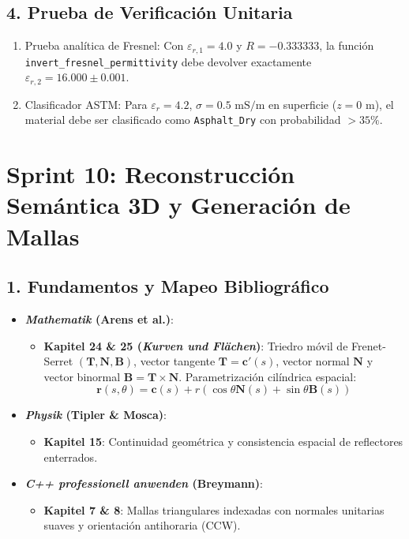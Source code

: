 \documentclass[11pt,a4paper]{article}
\begin{document}
\subsection{4. Prueba de Verificación Unitaria}
\begin{enumerate}
    \item Prueba analítica de Fresnel: Con $\varepsilon_{r,1} = 4.0$ y $R = -0.333333$, la función \texttt{invert\_fresnel\_permittivity} debe devolver exactamente $\varepsilon_{r,2} = 16.000 \pm 0.001$.
    \item Clasificador ASTM: Para $\varepsilon_r = 4.2$, $\sigma = 0.5\text{ mS/m}$ en superficie ($z=0\text{ m}$), el material debe ser clasificado como \texttt{Asphalt\_Dry} con probabilidad $> 35\%$.
\end{enumerate}

\section{Sprint 10: Reconstrucción Semántica 3D y Generación de Mallas}

\subsection{1. Fundamentos y Mapeo Bibliográfico}
\begin{itemize}
    \item \textbf{\textit{Mathematik} (Arens et al.)}:
    \begin{itemize}
        \item \textbf{Kapitel 24 \& 25 (\textit{Kurven und Flächen})}: Triedro móvil de Frenet-Serret $(\mathbf{T}, \mathbf{N}, \mathbf{B})$, vector tangente $\mathbf{T} = \mathbf{c}'(s)$, vector normal $\mathbf{N}$ y vector binormal $\mathbf{B} = \mathbf{T} \times \mathbf{N}$.
        Parametrización cilíndrica espacial:
        \begin{equation}
            \mathbf{r}(s, \theta) = \mathbf{c}(s) + r\left(\cos\theta \mathbf{N}(s) + \sin\theta \mathbf{B}(s)\right)
        \end{equation}
    \end{itemize}
    \item \textbf{\textit{Physik} (Tipler \& Mosca)}:
    \begin{itemize}
        \item \textbf{Kapitel 15}: Continuidad geométrica y consistencia espacial de reflectores enterrados.
    \end{itemize}
    \item \textbf{\textit{C++ professionell anwenden} (Breymann)}:
    \begin{itemize}
        \item \textbf{Kapitel 7 \& 8}: Mallas triangulares indexadas con normales unitarias suaves y orientación antihoraria (CCW).
    \end{itemize}
\end{itemize}
\end{document}
